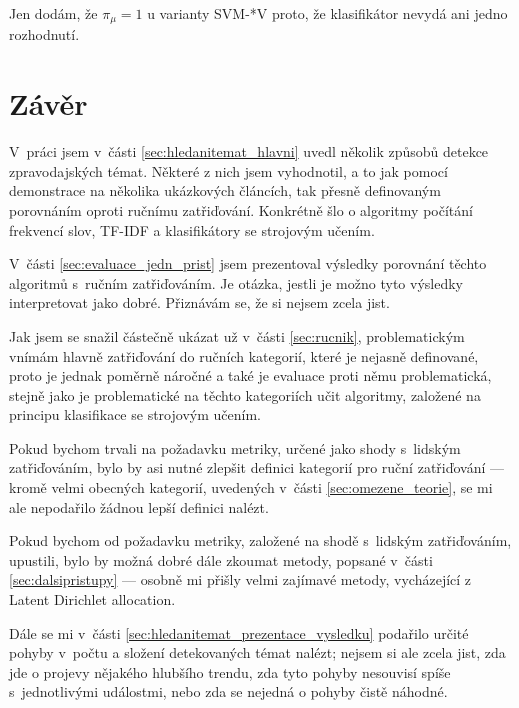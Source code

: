 \documentclass[12pt,a4paper]{report}
\def\chapwithtoc#1{
\chapter*{#1}
\addcontentsline{toc}{chapter}{#1}
}
\begin{document}
Jen dodám, že $\pi_{\mu}=1$ u varianty SVM-*V proto, že klasifikátor nevydá ani jedno rozhodnutí.

\chapwithtoc{Závěr}




V~práci jsem v~části \ref{sec:hledanitemat_hlavni} uvedl několik způsobů detekce zpravodajských témat. Některé z nich jsem vyhodnotil, a to jak pomocí demonstrace na několika ukázkových článcích, tak přesně definovaným porovnáním oproti ručnímu zatřiďování. Kon\-krét\-ně šlo o algoritmy počítání frekvencí slov, TF-IDF a klasifikátory se strojovým učením.

V~části \ref{sec:evaluace_jedn_prist} jsem prezentoval výsledky porovnání těchto algoritmů s~ručním zatřiďováním. Je otázka, jestli je možno tyto výsledky interpretovat jako dobré. Přiznávám se, že si nejsem zcela jist.

Jak jsem se snažil částečně ukázat už v~části \ref{sec:rucnik}, problematickým vnímám hlavně zatřiďování do ručních kategorií, které je nejasně definované, proto je jednak poměrně náročné a také je evaluace proti němu problematická, stejně jako je problematické na těchto kategoriích učit algoritmy, založené na principu klasifikace se strojovým učením.

Pokud bychom trvali na požadavku metriky, určené jako shody s~lidským zatřiďováním, bylo by asi nutné zlepšit definici kategorií pro ruční zatřiďování --- kromě velmi obecných kategorií, uvedených v~části \ref{sec:omezene_teorie}, se mi ale nepodařilo žádnou lepší definici nalézt. 

Pokud bychom od požadavku metriky, za\-lo\-že\-né na shodě s~lid\-ským za\-třiď\-o\-vá\-ním, upustili, bylo by možná dobré dále zkoumat metody, popsané v~části \ref{sec:dalsipristupy} --- osobně mi přišly velmi zajímavé metody, vycházející z Latent Dirichlet allocation.

Dále se mi v~části \ref{sec:hledanitemat_prezentace_vysledku} podařilo určité pohyby v~počtu a složení detekovaných témat nalézt; nejsem si ale zcela jist, zda jde o projevy nějakého hlubšího trendu, zda tyto pohyby nesouvisí spíše s~jednotlivými událostmi, nebo zda se nejedná o pohyby čistě náhodné.


\def\bibname{Seznam použité literatury}



    
\end{document}
